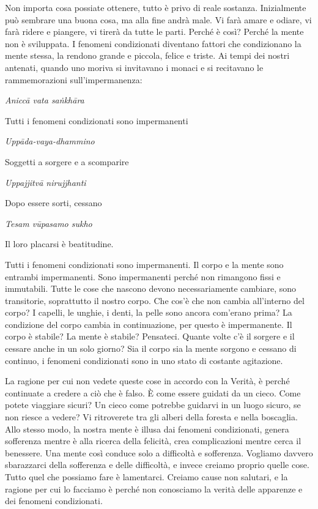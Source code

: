 Non importa cosa possiate ottenere, tutto è privo di reale sostanza.
Inizialmente può sembrare una buona cosa, ma alla fine andrà male. Vi
farà amare e odiare, vi farà ridere e piangere, vi tirerà da tutte le
parti. Perché è così? Perché la mente non è sviluppata. I fenomeni
condizionati diventano fattori che condizionano la mente stessa, la
rendono grande e piccola, felice e triste. Ai tempi dei nostri antenati,
quando uno moriva si invitavano i monaci e si recitavano le
rammemorazioni sull'impermanenza:

\emph{Aniccā vata saṅkhāra}

Tutti i fenomeni condizionati sono impermanenti

\emph{Uppāda-vaya-dhammino}

Soggetti a sorgere e a scomparire

\emph{Uppajjitvā nirujjhanti}

Dopo essere sorti, cessano

\emph{Tesam vūpasamo sukho}

Il loro placarsi è beatitudine.

Tutti i fenomeni condizionati sono impermanenti. Il corpo e la mente
sono entrambi impermanenti. Sono impermanenti perché non rimangono fissi
e immutabili. Tutte le cose che nascono devono necessariamente cambiare,
sono transitorie, soprattutto il nostro corpo. Che cos'è che non cambia
all'interno del corpo? I capelli, le unghie, i denti, la pelle sono
ancora com'erano prima? La condizione del corpo cambia in continuazione,
per questo è impermanente. Il corpo è stabile? La mente è stabile?
Pensateci. Quante volte c'è il sorgere e il cessare anche in un solo
giorno? Sia il corpo sia la mente sorgono e cessano di continuo, i
fenomeni condizionati sono in uno stato di costante agitazione.

La ragione per cui non vedete queste cose in accordo con la Verità, è
perché continuate a credere a ciò che è falso. È come essere guidati da
un cieco. Come potete viaggiare sicuri? Un cieco come potrebbe guidarvi
in un luogo sicuro, se non riesce a vedere? Vi ritroverete tra gli
alberi della foresta e nella boscaglia. Allo stesso modo, la nostra
mente è illusa dai fenomeni condizionati, genera sofferenza mentre è
alla ricerca della felicità, crea complicazioni mentre cerca il
benessere. Una mente così conduce solo a difficoltà e sofferenza.
Vogliamo davvero sbarazzarci della sofferenza e delle difficoltà, e
invece creiamo proprio quelle cose. Tutto quel che possiamo fare è
lamentarci. Creiamo cause non salutari, e la ragione per cui lo facciamo
è perché non conosciamo la verità delle apparenze e dei fenomeni
condizionati.

